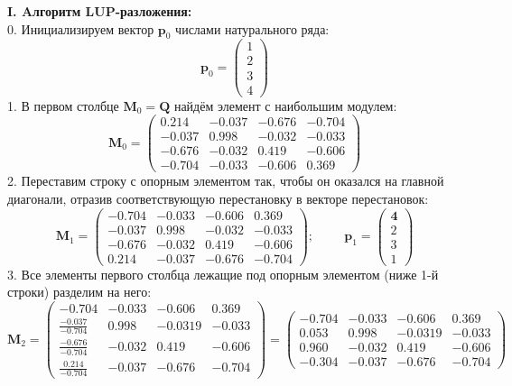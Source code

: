 \documentclass[a4paper]{article}
\begin{document}
{\large\bf{I. Aлгоритм LUP-разложения:}}\\
0. Инициализируем вектор $\mathbf{p}_0$ числами натурального ряда:
\vspace{-0.2cm}
\[
\mathbf{p}_0 =
\begin{pmatrix}
    1 \\
    2 \\
    3 \\
    4
\end{pmatrix}
\]
1. В первом столбце $\mathbf{M}_0 = \mathbf{Q}$ найдём элемент с наибольшим модулем:
\[
    \mathbf{M}_0 =
    \begin{pmatrix}
        0.214 & -0.037 &  -0.676 &  -0.704 \\
        -0.037 &   0.998 & -0.032 & -0.033 \\
        -0.676 & -0.032  &  0.419 &  -0.606 \\
        \mathbf{-0.704} & -0.033  & -0.606  &   0.369
    \end{pmatrix}
\]
2.  Переставим строку с опорным элементом так, чтобы он оказался на главной диагонали, отразив соответствующую перестановку в векторе перестановок:
\[
    \mathbf{M}_1 =
    \begin{pmatrix}
        \mathbf{-0.704} & \mathbf{-0.033}  & \mathbf{-0.606}  & \mathbf{0.369}\\
        -0.037 &   0.998 & -0.032 & -0.033 \\
        -0.676 & -0.032  &  0.419 &  -0.606 \\
        \mathit{0.214} & \mathit{-0.037} &  \mathit{-0.676} &  \mathit{-0.704}
    \end{pmatrix}; \hspace{1cm}
        \mathbf{p}_1 =
    \begin{pmatrix}
        \mathbf{4} \\
        2 \\
        3 \\
        \mathit{1}
    \end{pmatrix}
\]
3. Все элементы первого столбца лежащие под опорным элементом (ниже 1-й строки) разделим на него:
\[
\mathbf{M}_2 =
\begin{pmatrix}
    \mathbf{-0.704} & -0.033  & -0.606  & 0.369\\
    \mathit{\frac{-0.037}{-0.704}} &   0.998 & -0.0319 & -0.033 \\
    \mathit{\frac{-0.676}{-0.704}} & -0.032  &  0.419 &  -0.606 \\
    \mathit{\frac{0.214}{-0.704}} & -0.037 & -0.676 &  -0.704
\end{pmatrix} =
\begin{pmatrix}
    \mathbf{-0.704} & -0.033  & -0.606  & 0.369\\
    \mathit{0.053} &   0.998 & -0.0319 & -0.033 \\
    \mathit{0.960} & -0.032  &  0.419 &  -0.606 \\
    \mathit{-0.304} & -0.037 & -0.676 &  -0.704
\end{pmatrix}
\]
\end{document}
